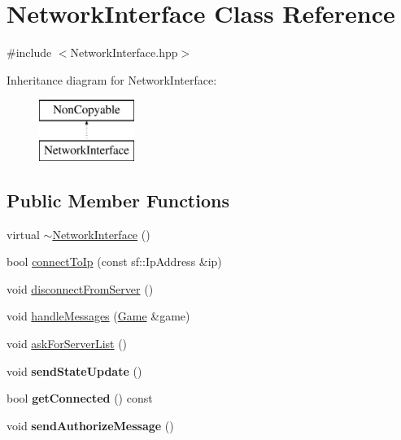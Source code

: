 \hypertarget{class_network_interface}{\section{Network\-Interface Class Reference}
\label{class_network_interface}
}


{\ttfamily \#include $<$Network\-Interface.\-hpp$>$}

Inheritance diagram for Network\-Interface\-:\begin{figure}[H]
\begin{center}
\leavevmode
\includegraphics[height=2.000000cm]{class_network_interface}
\end{center}
\end{figure}
\subsection*{Public Member Functions}
\begin{DoxyCompactItemize}
\item 
virtual \hyperlink{class_network_interface_adc72badb87b206431e240704e9aaa7c1}{$\sim$\-Network\-Interface} ()
\item 
bool \hyperlink{class_network_interface_addb6ab95cd5650952ac96270dc93c584}{connect\-To\-Ip} (const sf\-::\-Ip\-Address \&ip)
\item 
void \hyperlink{class_network_interface_a56f56d384eb1c6467e9b06d8e6b0b270}{disconnect\-From\-Server} ()
\item 
void \hyperlink{class_network_interface_a3589d7035ab5b0811a4026717dddc4a8}{handle\-Messages} (\hyperlink{class_game}{Game} \&game)
\item 
void \hyperlink{class_network_interface_a911ec8a94345995c2a9b8de593d65449}{ask\-For\-Server\-List} ()
\item 
\hypertarget{class_network_interface_af6129658a71407335a3db9ce15946893}{void {\bfseries send\-State\-Update} ()}\label{class_network_interface_af6129658a71407335a3db9ce15946893}

\item 
\hypertarget{class_network_interface_aae98c4b2b4d994f8eb20ae2c319b5b8a}{bool {\bfseries get\-Connected} () const }\label{class_network_interface_aae98c4b2b4d994f8eb20ae2c319b5b8a}

\item 
\hypertarget{class_network_interface_ae7761124af88949f00d0c209a11c2384}{void {\bfseries send\-Authorize\-Message} ()}\label{class_network_interface_ae7761124af88949f00d0c209a11c2384}

\end{DoxyCompactItemize}


